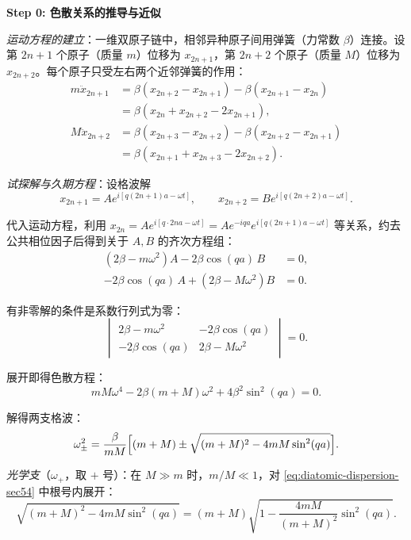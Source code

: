 \begin{derivationbox}[标准解题过程]
\textbf{Step 0: 色散关系的推导与近似}

\textit{运动方程的建立}：一维双原子链中，相邻异种原子间用弹簧（力常数 $\beta$）连接。设第 $2n+1$ 个原子（质量 $m$）位移为 $x_{2n+1}$，第 $2n+2$ 个原子（质量 $M$）位移为 $x_{2n+2}$。每个原子只受左右两个近邻弹簧的作用：
\begin{align}
m\ddot{x}_{2n+1}&=\beta(x_{2n+2}-x_{2n+1})-\beta(x_{2n+1}-x_{2n})\nonumber\\
&=\beta(x_{2n}+x_{2n+2}-2x_{2n+1}),\\
M\ddot{x}_{2n+2}&=\beta(x_{2n+3}-x_{2n+2})-\beta(x_{2n+2}-x_{2n+1})\nonumber\\
&=\beta(x_{2n+1}+x_{2n+3}-2x_{2n+2}).
\end{align}

\textit{试探解与久期方程}：设格波解
\begin{equation}
x_{2n+1}=Ae^{i[q(2n+1)a-\omega t]},\qquad x_{2n+2}=Be^{i[q(2n+2)a-\omega t]}.
\end{equation}

代入运动方程，利用 $x_{2n}=Ae^{i[q\cdot2na-\omega t]}=Ae^{-iqa}e^{i[q(2n+1)a-\omega t]}$ 等关系，约去公共相位因子后得到关于 $A,B$ 的齐次方程组：
\begin{align}
(2\beta-m\omega^2)A-2\beta\cos(qa)\,B&=0,\\
-2\beta\cos(qa)\,A+(2\beta-M\omega^2)B&=0.
\end{align}

有非零解的条件是系数行列式为零：
\begin{equation}
\begin{vmatrix}
2\beta-m\omega^2 & -2\beta\cos(qa)\\
-2\beta\cos(qa) & 2\beta-M\omega^2
\end{vmatrix}=0.
\end{equation}

展开即得色散方程：
\begin{equation}
mM\omega^4-2\beta(m+M)\omega^2+4\beta^2\sin^2(qa)=0.
\end{equation}

解得两支格波：
\begin{equation}
\omega_{\pm}^2=\frac{\beta}{mM}\Bigl[(m+M)\pm\sqrt{(m+M)^2-4mM\sin^2(qa)}\Bigr].
\label{eq:diatomic-dispersion-sec54}
\end{equation}

\textit{光学支}（$\omega_+$，取 $+$ 号）：在 $M\gg m$ 时，$m/M\ll1$，对 \eqref{eq:diatomic-dispersion-sec54} 中根号内展开：
\begin{equation}
\sqrt{(m+M)^2-4mM\sin^2(qa)}=(m+M)\sqrt{1-\frac{4mM}{(m+M)^2}\sin^2(qa)}.
\end{equation}


\end{derivationbox}
